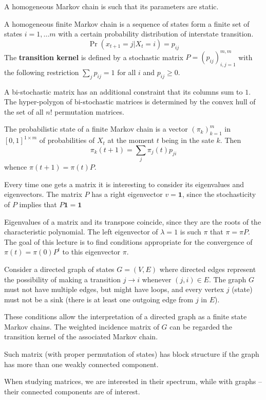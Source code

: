 \documentclass[a4paper]{article}
\newcommand{\one}{\mathbf{1}}
\begin{document}
A homogeneous Markov chain is such that its parameters are static.

A homogeneous finite Markov chain is a sequence of states form a finite set of
states $i=1,\ldots m$ with a certain probability distribution of interstate transition.
\[\Pr( x_{t+1} = j\rvert X_t = i) = p_{ij}\]
The \textbf{transition kernel} is defined by a stochastic matrix $P = (p_{ij})_{i,j=1}^{m,m}$
with the following restriction $\sum_j p_{ij} = 1$ for all $i$ and $p_{ij}\geq0$.

A bi-stochastic matrix has an additional constraint that its columns sum to $1$.
The hyper-polygon of bi-stochastic matrices is determined by the convex hull of
the set of all $n!$ permutation matrices.

The probabilistic state of a finite Markov chain is a vector $(\pi_k)_{k=1}^m$ in
$[0,1]^{1\times m}$ of probabilities of $X_t$ at the moment $t$ being in the sate $k$.
Then 
\[\pi_k(t+1) = \sum_j \pi_j(t) p_{ji}\]
whence $\pi(t+1) = \pi(t)P$.

Every time one gets a matrix it is interesting to consider its eigenvalues and
eigenvectors. The matrix $P$ has a right eigenvector $v = \one$, since
the stochasticity of $P$ implies that $P\one = \one$

Eigenvalues of a matrix and its transpose coincide, since they are the roots of
the characteristic polynomial. The left eigenvector of $\lambda = 1$ is such $\pi$
that $\pi = \pi P$. The goal of this lecture is to find conditions appropriate
for the convergence of $\pi(t) = \pi(0) P^t$ to this eigenvector $\pi$.

Consider a directed graph of states $G=(V,E)$ where directed edges represent the
possibility of making a transition $j\to i$ whenever $(j,i)\in E$.
The graph $G$ must not have multiple edges, but might have loops, and every vertex
$j$ (state) must not be a sink (there is at least one outgoing edge from $j$ in $E$).

These conditions allow the interpretation of a directed graph as a finite state
Markov chains. The weighted incidence matrix of $G$ can be regarded the transition
kernel of the associated Markov chain.

Such matrix (with proper permutation of states) has block structure if the graph
has more than one weakly connected component.

When studying matrices, we are interested in their spectrum, while with graphs --
their connected components are of interest.
\end{document}
